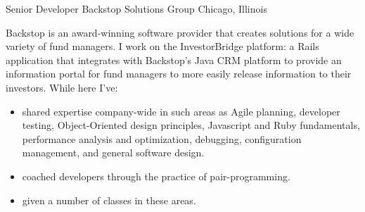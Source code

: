 \documentclass[11pt,letterpaper]{moderncv}
\begin{document}
 {Senior Developer}
         {Backstop Solutions Group} {Chicago, Illinois} {} {
Backstop is an award-winning software provider that creates solutions
for a wide variety of fund managers.  I work on the InvestorBridge
platform: a Rails application that integrates with Backstop's Java CRM
platform to provide an information portal for fund managers to
more easily release information to their investors.\newline
While here I've:
\begin{itemize}
  \item shared expertise company-wide in such areas as Agile planning,
    developer testing, Object-Oriented design principles, Javascript
    and Ruby fundamentals, performance analysis and optimization,
    debugging, configuration management, and general software design.
  \item coached developers through the practice of pair-programming.
  \item given a number of classes in these areas.
\end{itemize}
}
\end{document}

